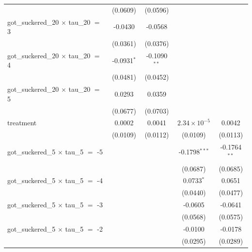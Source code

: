 \begin{tabular}{lcccc}
                                                 & (0.0609)        & (0.0596)        &                       &   \\   
   got\_suckered\_20 $\times$ tau\_20 $=$ 3      & -0.0430         & -0.0568         &                       &   \\   
                                                 & (0.0361)        & (0.0376)        &                       &   \\   
   got\_suckered\_20 $\times$ tau\_20 $=$ 4      & -0.0931$^{*}$   & -0.1090$^{**}$  &                       &   \\   
                                                 & (0.0481)        & (0.0452)        &                       &   \\   
   got\_suckered\_20 $\times$ tau\_20 $=$ 5      & 0.0293          & 0.0359          &                       &   \\   
                                                 & (0.0677)        & (0.0703)        &                       &   \\   
   treatment                                     & 0.0002          & 0.0041          & $2.34\times 10^{-5}$  & 0.0042\\   
                                                 & (0.0109)        & (0.0112)        & (0.0109)              & (0.0113)\\   
   got\_suckered\_5 $\times$ tau\_5 $=$ -5       &                 &                 & -0.1798$^{***}$       & -0.1764$^{**}$\\   
                                                 &                 &                 & (0.0687)              & (0.0685)\\   
   got\_suckered\_5 $\times$ tau\_5 $=$ -4       &                 &                 & 0.0733$^{*}$          & 0.0651\\   
                                                 &                 &                 & (0.0440)              & (0.0477)\\   
   got\_suckered\_5 $\times$ tau\_5 $=$ -3       &                 &                 & -0.0605               & -0.0641\\   
                                                 &                 &                 & (0.0568)              & (0.0575)\\   
   got\_suckered\_5 $\times$ tau\_5 $=$ -2       &                 &                 & -0.0100               & -0.0178\\   
                                                 &                 &                 & (0.0295)              & (0.0289)\\   

\end{tabular}
